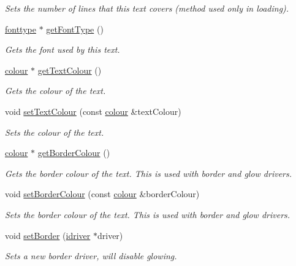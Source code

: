 \begin{DoxyCompactItemize}
\begin{DoxyCompactList}\small\item\em Sets the number of lines that this text covers (method used only in loading). \end{DoxyCompactList}\item 
\hyperlink{classflounder_1_1fonttype}{fonttype} $\ast$ \hyperlink{classflounder_1_1text_aeed1638cf36d796822e56370a9f6278b}{get\+Font\+Type} ()
\begin{DoxyCompactList}\small\item\em Gets the font used by this text. \end{DoxyCompactList}\item 
\hyperlink{classflounder_1_1colour}{colour} $\ast$ \hyperlink{classflounder_1_1text_a583497e298f908f71d7d3982999eccbb}{get\+Text\+Colour} ()
\begin{DoxyCompactList}\small\item\em Gets the colour of the text. \end{DoxyCompactList}\item 
void \hyperlink{classflounder_1_1text_a8048287405568863030770812141f48d}{set\+Text\+Colour} (const \hyperlink{classflounder_1_1colour}{colour} \&text\+Colour)
\begin{DoxyCompactList}\small\item\em Sets the colour of the text. \end{DoxyCompactList}\item 
\hyperlink{classflounder_1_1colour}{colour} $\ast$ \hyperlink{classflounder_1_1text_a9b6ae8abc8233838a5fc164845c87cde}{get\+Border\+Colour} ()
\begin{DoxyCompactList}\small\item\em Gets the border colour of the text. This is used with border and glow drivers. \end{DoxyCompactList}\item 
void \hyperlink{classflounder_1_1text_a6ea3ea5312d5873c1a64cd9b3efc8deb}{set\+Border\+Colour} (const \hyperlink{classflounder_1_1colour}{colour} \&border\+Colour)
\begin{DoxyCompactList}\small\item\em Sets the border colour of the text. This is used with border and glow drivers. \end{DoxyCompactList}\item 
void \hyperlink{classflounder_1_1text_abe7f908c5a19f4994555ceb18e6acd01}{set\+Border} (\hyperlink{classflounder_1_1idriver}{idriver} $\ast$driver)
\begin{DoxyCompactList}\small\item\em Sets a new border driver, will disable glowing. \end{DoxyCompactList}\item 

\end{DoxyCompactItemize}
